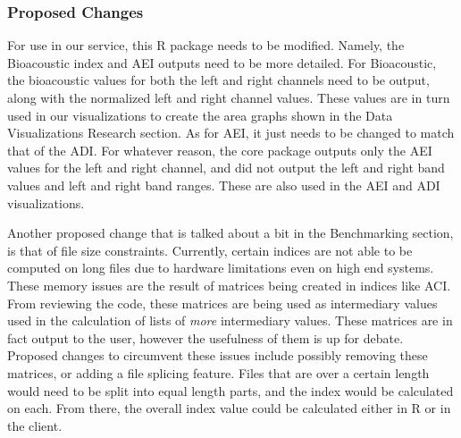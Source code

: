 \subsubsection{Proposed Changes}
For use in our service, this R package needs to be modified. Namely, the Bioacoustic index and AEI outputs need to be more detailed. For Bioacoustic, the bioacoustic values for both the left and right channels need to be output, along with the normalized left and right channel values. These values are in turn used in our visualizations to create the area graphs shown in the Data Visualizations Research section. As for AEI, it just needs to be changed to match that of the ADI. For whatever reason, the core package outputs only the AEI values for the left and right channel, and did not output the left and right band values and left and right band ranges. These are also used in the AEI and ADI visualizations.\par
Another proposed change that is talked about a bit in the Benchmarking section, is that of file size constraints. Currently, certain indices are not able to be computed on long files due to hardware limitations even on high end systems. These memory issues are the result of matrices being created in indices like ACI. From reviewing the code, these matrices are being used as intermediary values used in the calculation of lists of \textit{more} intermediary values. These matrices are in fact output to the user, however the usefulness of them is up for debate. Proposed changes to circumvent these issues include possibly removing these matrices, or adding a file splicing feature. Files that are over a certain length would need to be split into equal length parts, and the index would be calculated on each. From there, the overall index value could be calculated either in R or in the client.
